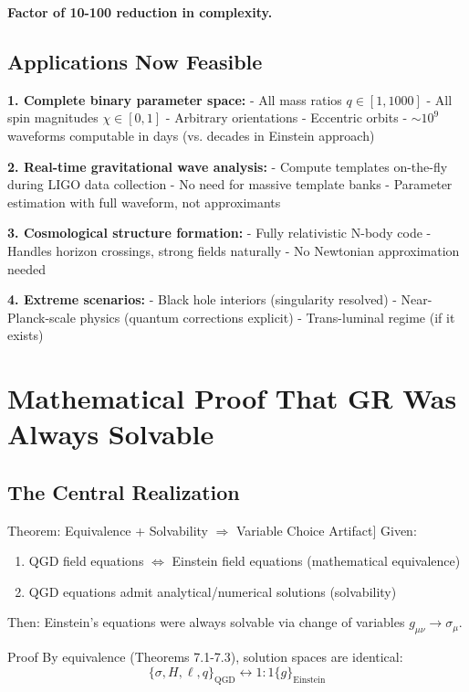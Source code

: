 \documentclass[11pt,a4paper]{article}
\theoremstyle{definition}
\theoremstyle{remark}
\begin{document}
	\textbf{Factor of 10-100 reduction in complexity.}
	
	\subsection{Applications Now Feasible}
	
	\textbf{1. Complete binary parameter space:}
	- All mass ratios $q \in [1, 1000]$
	- All spin magnitudes $\chi \in [0, 1]$
	- Arbitrary orientations
	- Eccentric orbits
	- $\sim 10^9$ waveforms computable in days (vs. decades in Einstein approach)
	
	\textbf{2. Real-time gravitational wave analysis:}
	- Compute templates on-the-fly during LIGO data collection
	- No need for massive template banks
	- Parameter estimation with full waveform, not approximants
	
	\textbf{3. Cosmological structure formation:}
	- Fully relativistic N-body code
	- Handles horizon crossings, strong fields naturally
	- No Newtonian approximation needed
	
	\textbf{4. Extreme scenarios:}
	- Black hole interiors (singularity resolved)
	- Near-Planck-scale physics (quantum corrections explicit)
	- Trans-luminal regime (if it exists)
	
	\section{Mathematical Proof That GR Was Always Solvable}
	
	\subsection{The Central Realization}
	
	Theorem: Equivalence + Solvability $\Rightarrow$ Variable Choice Artifact]
		Given:
		\begin{enumerate}
			\item QGD field equations $\iff$ Einstein field equations (mathematical equivalence)
			\item QGD equations admit analytical/numerical solutions (solvability)
		\end{enumerate}
		Then: Einstein's equations were always solvable via change of variables $g_{\mu\nu} \to \sigma_\mu$.
	
	Proof
		By equivalence (Theorems 7.1-7.3), solution spaces are identical:
		\begin{equation}
			\{\sigma, H, \ell, q\}_{\text{QGD}} \leftrightarrow{1:1} \{g\}_{\text{Einstein}}
		\end{equation}
		
\end{document}
